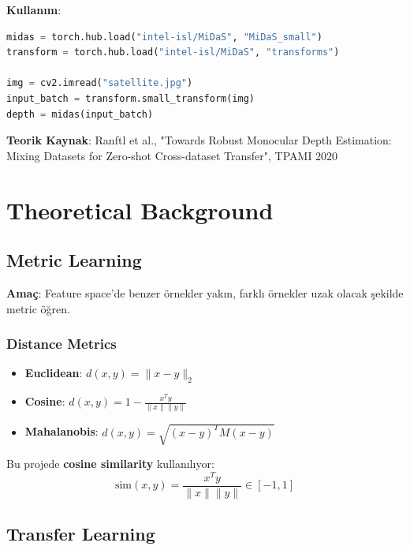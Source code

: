 \documentclass[12pt,a4paper]{article}
\begin{document}
\textbf{Kullanım}:
\begin{lstlisting}[language=Python]
midas = torch.hub.load("intel-isl/MiDaS", "MiDaS_small")
transform = torch.hub.load("intel-isl/MiDaS", "transforms")

img = cv2.imread("satellite.jpg")
input_batch = transform.small_transform(img)
depth = midas(input_batch)
\end{lstlisting}

\textbf{Teorik Kaynak}: Ranftl et al., "Towards Robust Monocular Depth Estimation: Mixing Datasets for Zero-shot Cross-dataset Transfer", TPAMI 2020

\section{Theoretical Background}

\subsection{Metric Learning}

\textbf{Amaç}: Feature space'de benzer örnekler yakın, farklı örnekler uzak olacak şekilde metric öğren.

\subsubsection{Distance Metrics}
\begin{itemize}
    \item \textbf{Euclidean}: $d(x, y) = \|x - y\|_2$
    \item \textbf{Cosine}: $d(x, y) = 1 - \frac{x^T y}{\|x\|\|y\|}$
    \item \textbf{Mahalanobis}: $d(x, y) = \sqrt{(x-y)^T M (x-y)}$
\end{itemize}

Bu projede \textbf{cosine similarity} kullanılıyor:
\begin{equation}
    \text{sim}(x, y) = \frac{x^T y}{\|x\|\|y\|} \in [-1, 1]
\end{equation}

\subsection{Transfer Learning}
\end{document}
